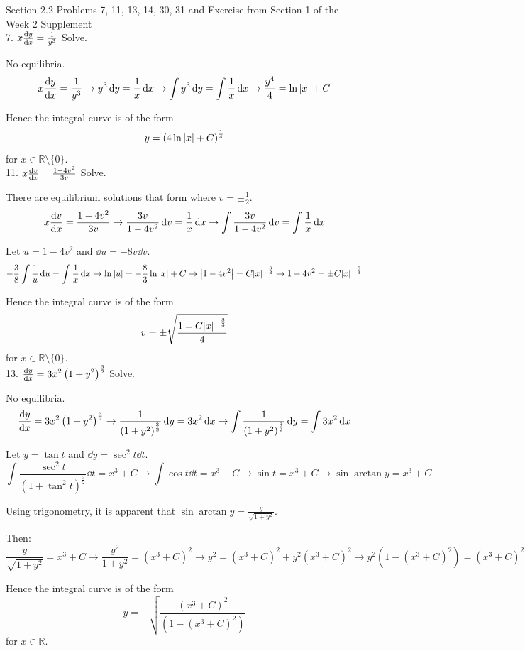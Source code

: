 \documentclass[11pt]{article}
\newcommand{\br}[1]{\left(#1\right)}
\newcommand{\cbr}[1]{\{#1\}}
\begin{document}
Section 2.2 Problems 7, 11, 13, 14, 30, 31 and Exercise from Section 1 of the Week 2 Supplement\\

7. $x\dv{y}{x} = \frac{1}{y^3}$ Solve.

No equilibria.
$$x\dv{y}{x} = \frac{1}{y^3} \to y^3\dd{y} = \frac{1}{x}\dd{x} \to \int y^3\dd{y} = \int \frac{1}{x}\dd{x} \to \frac{y^4}{4} = \ln{\abs{x}} + C$$

Hence the integral curve is of the form $$y=\br{4\ln{\abs{x}}+C}^\frac{1}{4}$$ for $x\in \mathbb{R}\setminus\cbr{0}$.\\

11. $x\dv{v}{x} = \frac{1-4v^2}{3v}$ Solve.

There are equilibrium solutions that form where $v=\pm \frac{1}{2}$.
$$x\dv{v}{x} = \frac{1-4v^2}{3v} \to \frac{3v}{1-4v^2}\dd{v} = \frac{1}{x}\dd{x} \to \int \frac{3v}{1-4v^2}\dd{v} = \int \frac{1}{x}\dd{x}$$

Let $u=1-4v^2$ and  $\dd{u} = -8v\dd{v}$.
$$-\frac{3}{8}\int \frac{1}{u}\dd{u} = \int \frac{1}{x}\dd{x} \to \ln{\abs{u}} = -\frac{8}{3}\ln{\abs{x}} + C \to \abs{1-4v^2} = C\abs{x}^{-\frac{8}{3}} \to 1-4v^2 = \pm C\abs{x}^{-\frac{8}{3}}$$

Hence the integral curve is of the form $$v=\pm\sqrt{\frac{1 \mp C\abs{x}^{-\frac{8}{3}}}{4}}$$ for $x\in \mathbb{R}\setminus\cbr{0}$.\\

13. $\dv{y}{x} = 3x^2\br{1+y^2}^{\frac{3}{2}}$ Solve.

No equilibria.
$$\dv{y}{x} = 3x^2\br{1+y^2}^{\frac{3}{2}} \to \frac{1}{\br{1+y^2}^{\frac{3}{2}}}\dd{y} = 3x^2\dd{x} \to \int \frac{1}{\br{1+y^2}^{\frac{3}{2}}}\dd{y} = \int 3x^2\dd{x}$$

Let $y=\tan{t}$ and $\dd{y} = \sec^2{t}\dd{t}$.
$$\int \frac{\sec^2{t}}{\br{1+\tan^2{t}}^{\frac{3}{2}}}\dd{t} = x^3 + C \to \int \cos{t}\dd{t} = x^3 + C \to \sin{t} = x^3 + C \to \sin{\arctan{y}} = x^3 + C$$

Using trigonometry, it is apparent that $\sin{\arctan{y}} = \frac{y}{\sqrt{1+y^2}}$.

Then:
$$\frac{y}{\sqrt{1+y^2}} = x^3 + C \to \frac{y^2}{1+y^2} = \br{x^3 + C}^2 \to y^2 = \br{x^3 + C}^2 + y^2\br{x^3 + C}^2 \to y^2\br{1-\br{x^3 + C}^2} = \br{x^3 + C}^2$$

Hence the integral curve is of the form $$y = \pm\sqrt{\frac{\br{x^3 + C}^2}{\br{1-\br{x^3 + C}^2}}}$$ for $x \in \mathbb{R}$.\\
\end{document}
